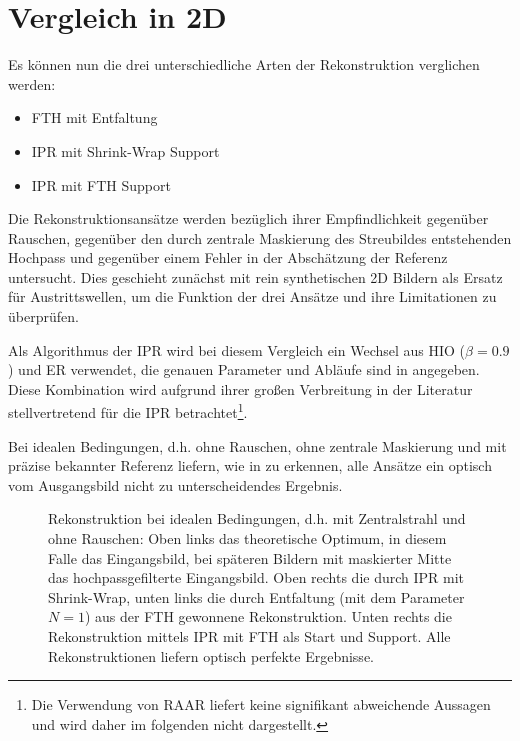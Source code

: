 \section{Vergleich in 2D}	
Es können nun die drei unterschiedliche Arten der Rekonstruktion verglichen werden:
\begin{itemize}
	\item FTH mit Entfaltung
	\item IPR mit Shrink-Wrap Support
	\item IPR mit FTH Support
\end{itemize}
Die Rekonstruktionsansätze werden bezüglich ihrer Empfindlichkeit gegenüber Rauschen, gegenüber den durch zentrale Maskierung des Streubildes entstehenden Hochpass und gegenüber einem Fehler in der Abschätzung der Referenz untersucht. Dies geschieht zunächst mit rein synthetischen 2D Bildern als Ersatz für Austrittswellen, um die Funktion der drei Ansätze und ihre Limitationen zu überprüfen.

Als Algorithmus der IPR wird bei diesem Vergleich ein Wechsel aus HIO ($\beta=0.9$) und ER verwendet, die genauen Parameter und Abläufe sind in  angegeben. Diese Kombination wird aufgrund ihrer großen Verbreitung in der Literatur stellvertretend für die IPR betrachtet\footnote{Die Verwendung von RAAR liefert keine signifikant abweichende Aussagen und wird daher im folgenden nicht dargestellt.}. 

Bei idealen Bedingungen, d.h. ohne Rauschen, ohne zentrale Maskierung und mit präzise bekannter Referenz liefern, wie in  zu erkennen, alle Ansätze ein optisch vom Ausgangsbild nicht zu unterscheidendes Ergebnis.

\begin{figure}
	\centering
	\caption[2D Rekonstruktion: Ideale Bedingungen]{Rekonstruktion bei idealen Bedingungen, d.h. mit Zentralstrahl und ohne Rauschen: Oben links das theoretische Optimum, in diesem Falle das Eingangsbild, bei späteren Bildern mit maskierter Mitte das hochpassgefilterte Eingangsbild. Oben rechts die durch IPR mit Shrink-Wrap, unten links die durch Entfaltung (mit dem Parameter $N=1$) aus der FTH gewonnene Rekonstruktion. Unten rechts die Rekonstruktion mittels IPR mit FTH als Start und Support. Alle Rekonstruktionen liefern optisch perfekte Ergebnisse. }
	\label{fig:recon2d-perfect}
\end{figure}

